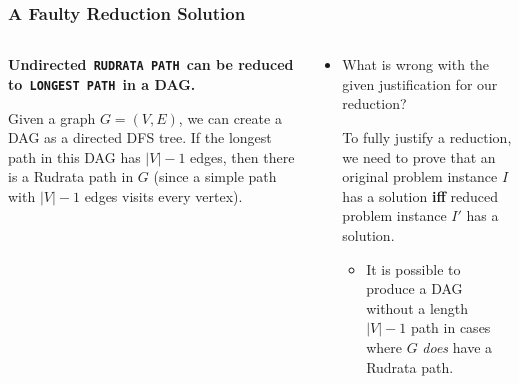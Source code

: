 \documentclass[10pt, xcolor={table, dvipsnames}, t]{beamer}
\begin{document}
\begin{frame}
\frametitle{A Faulty Reduction {\color{red} Solution}}
\begin{columns}[T]

\begin{column}{0.48\textwidth}
\small
\textbf{Undirected\texttt{ RUDRATA PATH }can be reduced to\texttt{ LONGEST PATH }in a DAG.}
\newline

Given a graph $G = (V, E)$, we can create a DAG as a directed DFS tree. If the longest path in this DAG has $|V| - 1$ edges, then there is a Rudrata path in $G$ (since a simple path with $|V| - 1$ edges visits every vertex).
\end{column}

\begin{column}{0.48\textwidth}
\small
\begin{itemize}
\item What is wrong with the given justification for our reduction?

{
  \color{red}
  To fully justify a reduction, we need to prove that an original problem instance $I$ has a solution \textbf{iff} reduced problem instance $I'$ has a solution.
  \begin{itemize}
  \item {\color{red} It is possible to produce a DAG without a length $|V| - 1$ path in cases where $G$ \textit{does} have a Rudrata path.}   
  \end{itemize}
}
\end{itemize}
\end{column}

\end{columns}
\end{frame}
\end{document}

